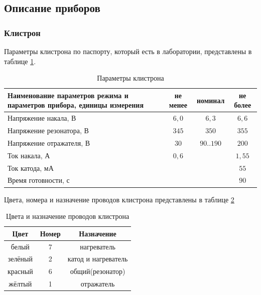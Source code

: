 \documentclass[a4paper,14pt]{extarticle}
\begin{document}
	\subsection{Описание приборов}
	\subsubsection{Клистрон}
	
	Параметры клистрона по паспорту, который есть в лаборатории, представлены в таблице \ref{tab1}.
	
	\begin{table}[h]
		\center
        \caption{Параметры клистрона}
        \label{tab1}
		\begin{tabular}{|p{7cm}|c|c|c|}
			\hline
			\centering Наименование параметров режима и параметров прибора, единицы измерения
			& не менее
			& номинал
			& не более \\ \hline
			\centering Напряжение накала, В
			& $6{,}0$
			& $6{,}3$
			& $6{,}6$ \\ \hline
			\centering Напряжение резонатора, В
			& $345$
			& $350$
			& $355$ \\ \hline
			\centering Напряжение отражателя, В
			& $30$
			& $90..190$
			& $200$ \\ \hline
			\centering Ток накала, А
			& $0{,}6$
			& 
			& $1{,}55$ \\ \hline
			\centering Ток катода, мА
			& 
			&
			& $55$ \\ \hline
			\centering Время готовности, с
			&
			&
			& $90$ \\ \hline
		\end{tabular}
	\end{table}
	
	Цвета, номера и назначение проводов клистрона представлены в таблице \ref{tab2}
	\begin{table}[h]
		\center
        \caption{Цвета и назначение проводов клистрона}
        \label{tab2}
		\begin{tabular}{|c|c|c|}
			\hline
			Цвет 	& Номер	& Назначение \\ \hline
			белый 	& 	7	& нагреватель\\ \hline
			зелёный & 	2	& катод и нагреватель\\ \hline
			красный & 	6	& общий(резонатор)\\ \hline
			жёлтый  & 	1	& отражатель\\ \hline
		\end{tabular}
	\end{table}
	
\end{document}
